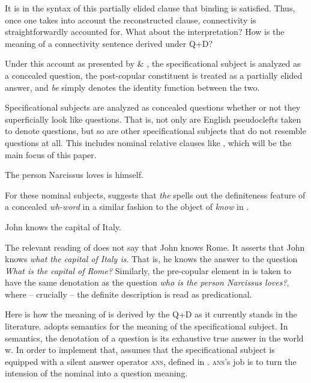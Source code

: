 \documentclass[output=paper,colorlinks,citecolor=brown,draft,draftmode]{langscibook}
\begin{document}
It is in the syntax of this  partially elided clause that binding is satisfied. Thus, once one takes into account the reconstructed clause, connectivity is straightforwardly accounted for. What about the interpretation? How is the meaning of a connectivity sentence derived under Q+D?

Under this account as presented by  \citet{schlenker2003clausalequation} \& \citet{romero2007connectivityunified}, the specificational subject is analyzed as a concealed question, the post-copular constituent is treated as a partially elided answer, and \textit{be} simply denotes the identity function between the two.

Specificational subjects are analyzed as concealed questions whether or not they superficially look like questions. That is, not only are  English pseudoclefts taken to denote questions, but so are other specificational subjects that  do not resemble questions at all.  This includes nominal relative clauses like , which will be the main focus of this paper.

\ea \label{conrelativa}The person Narcissus loves is himself.
\z


For these nominal subjects, \citet{schlenker2003clausalequation}  suggests that  \textit{the} spells out the definiteness feature of a concealed \textit{wh-word} in a similar fashion to the object of \textit{know} in .

\ea \label{know}John knows the capital of Italy. \hfill \citep{schlenker2003clausalequation}
\z

The relevant reading of  does not say that John knows Rome. It asserts that John knows \textit{what the capital of Italy is}. That is, he knows the answer to the question \textit{What is the capital of Rome?} Similarly, the pre-copular element in  is taken to have the same denotation as the question \textit{who is the person Narcissus loves?}, where -- crucially -- the definite description is read as predicational.


Here is how the meaning of  is derived by the Q+D as it currently stands in the literature.  \citet{schlenker2003clausalequation}
adopts   semantics for the meaning of the specificational subject. In  semantics, the denotation of a question is its exhaustive true answer in the world w. In order to implement that, \citet{romero2007connectivityunified} assumes that the specificational subject is equipped with a silent answer operator \textsc{ans}, defined in .  \textsc{ans}'s job is to turn the intension of the nominal into a question meaning.
\end{document}
